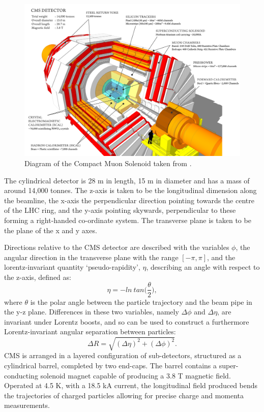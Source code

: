 \begin{figure}
  \centering
  \includegraphics[width=\textwidth]{Figs/machine/cms_120918_02.png}
  \caption{Diagram of the Compact Muon Solenoid taken from
  \cite{Sakuma:2013jqa}.}
  \label{fig:cms_diagram}
\end{figure}

The cylindrical detector is 28 m in length, 15 m in diameter and has a mass of 
around 14,000 tonnes. 
The z-axis is taken to be the longitudinal dimension along the beamline, the
x-axis the perpendicular direction pointing towards the centre of the LHC ring, 
and the y-axis pointing skywards, perpendicular to these forming a right-handed 
co-ordinate system. The transverse plane is taken to be the plane of the x and y
axes.

Directions relative to the CMS detector are described with the variables $\phi$,
the angular direction in the transverse plane with the range $[-\pi, \pi]$, and 
the lorentz-invariant quantity `pseudo-rapidity', $\eta$, describing an angle
with respect to the z-axis, defined as:
% 
\begin{equation}
\eta = - ln \ tan \Bigg( \frac{\theta}{2} \Bigg) ,
\end{equation}
% 
where $\theta$ is the polar angle between the particle trajectory and the beam
pipe in the y-z plane.
Differences in these two variables, namely $\Delta \phi$ and $\Delta 
\eta$, are invariant under Lorentz boosts, and so can be used to construct a 
furthermore Lorentz-invariant angular separation between particles:
% 
\begin{equation}
\Delta R = \sqrt{ (\Delta \eta)^2 + (\Delta \phi)^2}.
\end{equation}
% 
CMS is arranged in a layered configuration of sub-detectors, structured as a 
cylindrical barrel, completed by two end-caps. The barrel contains a
super-conducting solenoid magnet capable of producing a 3.8 T magnetic field. 
Operated at 4.5 K, with a 18.5 kA current, the longitudinal field produced bends
the trajectories of charged particles allowing for precise charge and momenta 
measurements.


